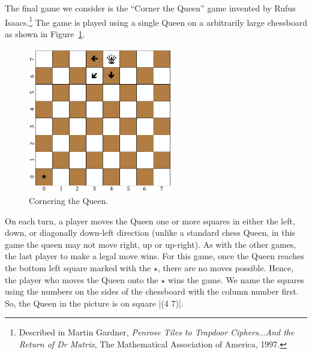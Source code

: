 \begin{schemeregion}
{{\begin{subexerciselist}
The final game we consider is the ``Corner the Queen'' game invented by Rufus Isaacs.\footnote{Described in Martin Gardner, \emph{Penrose Tiles to Trapdoor Ciphers$\ldots$And the Return of Dr Matrix}, The Mathematical Association of America, 1997.}  The game is played using a single Queen on a arbitrarily large chessboard as shown in Figure~\ref{fig:cornerqueen}.

\begin{figure}[!htb]
\begin{center}
\includegraphics[height=2.5in]{figures/cornerqueen.pdf}
\caption{Cornering the Queen.\label{fig:cornerqueen}}
\end{center}
\end{figure}

On each turn, a player moves the Queen one or more squares in either the left, down, or diagonally down-left direction (unlike a standard chess Queen, in this game the queen may not move right, up or up-right).  As with the other games, the last player to make a legal move wins.  For this game, once the Queen reaches the bottom left square marked with the $\star$, there are no moves possible.  Hence, the player who moves the Queen onto the $\star$ wins the game.  We name the squares using the numbers on the sides of the chessboard with the column number first.  So, the Queen in the picture is on square \scheme|(4 7)|.


\end{subexerciselist}}}
\end{schemeregion}
